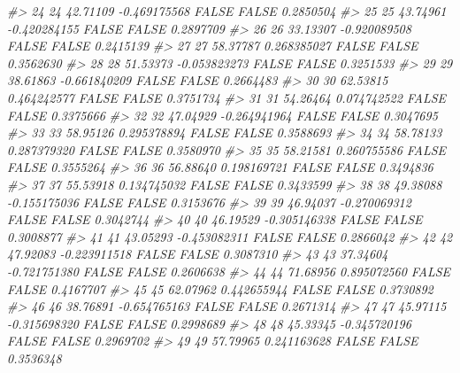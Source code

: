 \documentclass[
  oneside]{book}
\newenvironment{Shaded}{\begin{snugshade}}{\end{snugshade}}
\newcommand{\CommentTok}[1]{\textcolor[rgb]{0.56,0.35,0.01}{\textit{#1}}}
\begin{document}
\begin{Shaded}
\begin{Highlighting}[]
\CommentTok{\#\textgreater{} 24   24  42.71109 {-}0.469175568     FALSE       FALSE        0.2850504}
\CommentTok{\#\textgreater{} 25   25  43.74961 {-}0.420284155     FALSE       FALSE        0.2897709}
\CommentTok{\#\textgreater{} 26   26  33.13307 {-}0.920089508     FALSE       FALSE        0.2415139}
\CommentTok{\#\textgreater{} 27   27  58.37787  0.268385027     FALSE       FALSE        0.3562630}
\CommentTok{\#\textgreater{} 28   28  51.53373 {-}0.053823273     FALSE       FALSE        0.3251533}
\CommentTok{\#\textgreater{} 29   29  38.61863 {-}0.661840209     FALSE       FALSE        0.2664483}
\CommentTok{\#\textgreater{} 30   30  62.53815  0.464242577     FALSE       FALSE        0.3751734}
\CommentTok{\#\textgreater{} 31   31  54.26464  0.074742522     FALSE       FALSE        0.3375666}
\CommentTok{\#\textgreater{} 32   32  47.04929 {-}0.264941964     FALSE       FALSE        0.3047695}
\CommentTok{\#\textgreater{} 33   33  58.95126  0.295378894     FALSE       FALSE        0.3588693}
\CommentTok{\#\textgreater{} 34   34  58.78133  0.287379320     FALSE       FALSE        0.3580970}
\CommentTok{\#\textgreater{} 35   35  58.21581  0.260755586     FALSE       FALSE        0.3555264}
\CommentTok{\#\textgreater{} 36   36  56.88640  0.198169721     FALSE       FALSE        0.3494836}
\CommentTok{\#\textgreater{} 37   37  55.53918  0.134745032     FALSE       FALSE        0.3433599}
\CommentTok{\#\textgreater{} 38   38  49.38088 {-}0.155175036     FALSE       FALSE        0.3153676}
\CommentTok{\#\textgreater{} 39   39  46.94037 {-}0.270069312     FALSE       FALSE        0.3042744}
\CommentTok{\#\textgreater{} 40   40  46.19529 {-}0.305146338     FALSE       FALSE        0.3008877}
\CommentTok{\#\textgreater{} 41   41  43.05293 {-}0.453082311     FALSE       FALSE        0.2866042}
\CommentTok{\#\textgreater{} 42   42  47.92083 {-}0.223911518     FALSE       FALSE        0.3087310}
\CommentTok{\#\textgreater{} 43   43  37.34604 {-}0.721751380     FALSE       FALSE        0.2606638}
\CommentTok{\#\textgreater{} 44   44  71.68956  0.895072560     FALSE       FALSE        0.4167707}
\CommentTok{\#\textgreater{} 45   45  62.07962  0.442655944     FALSE       FALSE        0.3730892}
\CommentTok{\#\textgreater{} 46   46  38.76891 {-}0.654765163     FALSE       FALSE        0.2671314}
\CommentTok{\#\textgreater{} 47   47  45.97115 {-}0.315698320     FALSE       FALSE        0.2998689}
\CommentTok{\#\textgreater{} 48   48  45.33345 {-}0.345720196     FALSE       FALSE        0.2969702}
\CommentTok{\#\textgreater{} 49   49  57.79965  0.241163628     FALSE       FALSE        0.3536348}

\end{Highlighting}
\end{Shaded}
\end{document}
